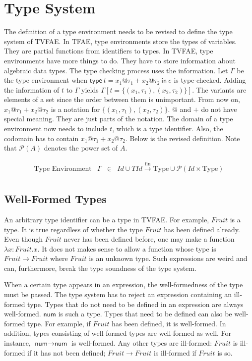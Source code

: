 \section{Type System}

The definition of a type environment needs to be revised to define the type
system of TVFAE. In TFAE, type environments store the types of variables. They
are partial functions from identifiers to types. In TVFAE, type environments
have more things to do. They have to store information about algebraic data
types. The type checking process uses the information. Let $\Gamma$ be the type
environment when $\textsf{type}\ t=x_1@\tau_1+x_2@\tau_2\ \textsf{in}\ e$ is
type-checked. Adding the information of $t$ to $\Gamma$ yields
$\Gamma[t=\{(x_1,\tau_1),(x_2,\tau_2)\}]$. The variants are elements of a set
since the order between them is unimportant. From now on,
$x_1@\tau_1+x_2@\tau_2$ is a notation for $\{(x_1,\tau_1),(x_2,\tau_2)\}$.
$@$ and $+$ do not have special meaning. They are just parts of the
notation. The domain of a type environment now needs to include $t$, which is
a type identifier. Also, the codomain has to contain $x_1@\tau_1+x_2@\tau_2$.
Below is the revised definition. Note that $\mathcal{P}(A)$ denotes the power set
of $A$.

\[
\begin{array}{rrcl}
\text{Type Environment} & \Gamma & \in &
\mathit{Id}\cup\mathit{TId}\xrightarrow{\text{fin}}
\text{Type}\cup\mathcal{P}(\mathit{Id}\times\text{Type}) \\
\end{array}
\]

\subsection{Well-Formed Types}

An arbitrary type identifier can be a type in TVFAE. For example, $Fruit$ is a
type. It is true regardless of whether the type $Fruit$ has been defined
already. Even though $Fruit$ never has been defined before, one may make a
function $\lambda x:Fruit.x$. It does not makes sense to allow a function
whose type is $Fruit\rightarrow Fruit$ where $Fruit$ is an unknown type.
Such expressions are weird and can, furthermore, break the type soundness of the
type system.

When a certain type appears in an expression, the well-formedness of the type
must be passed. The type system has to reject an expression containing an
ill-formed type. Types that do not need to be defined in an expression are
always well-formed. $\textsf{num}$ is such a type. Types that need to be defined
can also be well-formed type. For example, if $Fruit$ has been defined, it is
well-formed. In addition, types consisting of well-formed types are well-formed
as well. For instance, $\textsf{num}\rightarrow\textsf{num}$ is well-formed. Any
other types are ill-formed: $Fruit$ is ill-formed if it has not been defined;
$Fruit\rightarrow Fruit$ is ill-formed if $Fruit$ is so.

